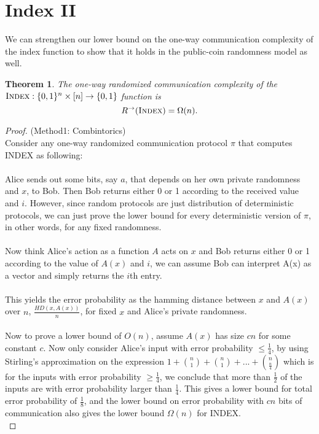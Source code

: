 \documentclass[11pt,oneside]{book}
\theoremstyle{plain}
\newtheorem{theorem}{Theorem}
\theoremstyle{definition}
\theoremstyle{plain}
\newcommand{\Index}{\textsc{Index}}
\begin{document}
 
\section{Index II}

We can strengthen our lower bound on the one-way communication complexity of the index function to show that it holds in the public-coin randomness model as well.

\begin{theorem}
	The one-way randomized communication complexity of the $\Index : \{0,1\}^n \times [n] \to \{0,1\}$ function is
	\[
	R^\rightarrow(\Index) = \Omega(n).
	\]
\end{theorem}

\begin{proof}
	(Method1: Combintorics)\\ 
	Consider any one-way randomized communication protocol $\pi$ that computes INDEX as following:\\
	\\
	Alice sends out some bits, say $a$, that depends on her own private randomness and $x$, to Bob. Then Bob returns either 0 or 1 according to the received value and $i$. However, since random protocols are just distribution of deterministic protocols, we can just prove the lower bound for every deterministic version of $\pi$, in other words, for any fixed randomness.\\
	\\
	Now think Alice's action as a function $A$ acts on $x$ and Bob returns either 0 or 1 according to the value of $A(x)$ and $i$, we can assume Bob can interpret A(x) as a vector and simply returns the $i$th entry.\\
	\\
	This yields the error probability as the hamming distance between $x$ and $A(x)$ over $n$, $\frac{HD(x,A(x))}{n}$, for fixed $x$ and Alice's private randomness. \\
	\\
	Now to prove a lower bound of $O(n)$, assume $A(x)$ has size $cn$ for some constant $c$. Now only consider Alice's input with error probability $\leq \frac14$, by using Stirling's approximation on the expression $1 + {n \choose 1} + {n \choose 1} + ... + {n \choose \frac{n}{4}}$ which is for the inputs with error probability $\ge \frac14$, we conclude that more than $\frac12$ of the inputs are with error probability larger than $\frac14$. This gives a lower bound for total error probability of $\frac18$, and the lower bound on error probability with $cn$ bits of communication also gives the lower bound $\Omega(n)$ for INDEX. \\

\end{proof}
\end{document}
